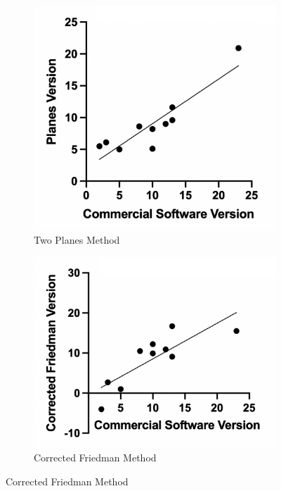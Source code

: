\begin{figure}
	\begin{center}
		\begin{subfigure}[b]{0.30\linewidth}
			\includegraphics[width=\linewidth]{figures/planes.png}
			\caption{Two Planes Method}
		\end{subfigure}
		\begin{subfigure}[b]{0.30\linewidth}
			\includegraphics[width=\linewidth]{figures/correctedfried.png}
			\caption{Corrected Friedman Method}

\end{subfigure}
\end{center}
\end{figure}

